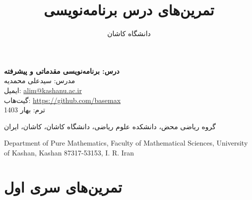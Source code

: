 \documentclass[a4paper,12pt]{article}
\begin{document}
	\title{تمرین‌های درس برنامه‌نویسی}
	\author{دانشگاه کاشان}
	\date{}
	\maketitle
	\thispagestyle{empty}
	
	\begin{center}
		\textbf{درس: برنامه‌نویسی مقدماتی و پیشرفته}\\
		مدرس: سیدعلی محمدیه\\
		ایمیل: \href{mailto:alim@kashanu.ac.ir}{alim@kashanu.ac.ir}\\
		گیت‌هاب: \url{https://github.com/basemax}\\
		ترم: بهار 1403  
		
		\vspace{1cm}
		گروه ریاضی محض، دانشکده علوم ریاضی، دانشگاه کاشان، کاشان، ایران\\
		\begin{LTR}
			Department of Pure Mathematics, Faculty of Mathematical Sciences, University of Kashan, Kashan 87317-53153, I. R. Iran		
		\end{LTR}
	\end{center}
	
	
	\newpage
	\section*{تمرین‌های سری اول}
	
\end{document}
